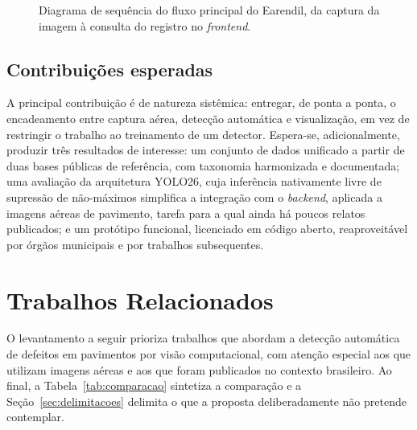 \documentclass[12pt]{article}
\newcommand{\fonte}[1]{%
  \vspace{2pt}\par\noindent{\footnotesize Fonte: #1}}
\begin{document}
\begin{figure}[H]
{}
\caption{Diagrama de sequência do fluxo principal do Earendil, da
captura da imagem à consulta do registro no \emph{frontend}.}
\label{fig:sequencia}
\fonte{elaborado pelo autor, 2026.}
\end{figure}




\subsection{Contribuições esperadas}
\label{sec:contribuicoes}

A principal contribuição é de natureza sistêmica: entregar, de ponta a
ponta, o encadeamento entre captura aérea, detecção automática e
visualização, em vez de restringir o trabalho ao treinamento de um
detector. Espera-se, adicionalmente, produzir três resultados de
interesse: um conjunto de dados unificado a partir de duas bases públicas
de referência, com taxonomia harmonizada e documentada; uma avaliação da
arquitetura YOLO26, cuja inferência nativamente livre de supressão de
não-máximos simplifica a integração com o \emph{backend}, aplicada a
imagens aéreas de pavimento, tarefa para a qual ainda há poucos relatos
publicados; e um protótipo funcional, licenciado em código aberto,
reaproveitável por órgãos municipais e por trabalhos subsequentes.

\section{Trabalhos Relacionados}
\label{sec:trabalhos-relacionados}

O levantamento a seguir prioriza trabalhos que abordam a detecção
automática de defeitos em pavimentos por visão computacional, com atenção
especial aos que utilizam imagens aéreas e aos que foram publicados no
contexto brasileiro. Ao final, a Tabela~\ref{tab:comparacao} sintetiza a
comparação e a Seção~\ref{sec:delimitacoes} delimita o que a proposta
deliberadamente não pretende contemplar.
\end{document}
